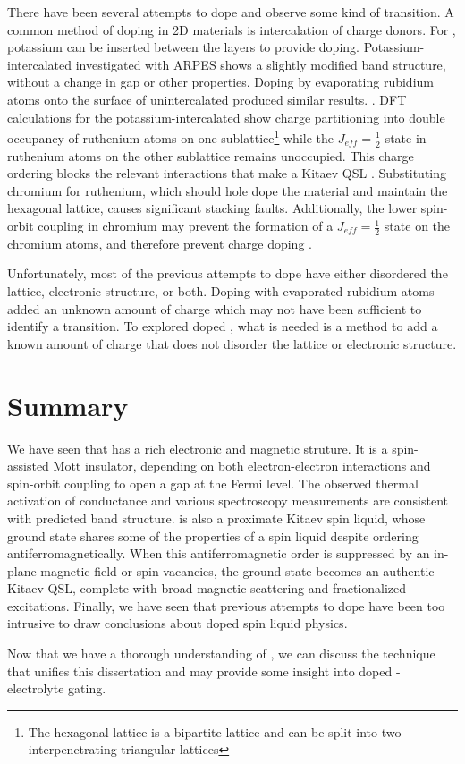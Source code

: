 There have been several attempts to dope \rucl and observe some kind of transition. A common method of doping in 2D materials is intercalation of charge donors. For \ruclnospace , potassium can be inserted between the layers to provide doping. Potassium-intercalated \rucl investigated with ARPES shows a slightly modified band structure, without a change in gap or other properties. Doping by evaporating rubidium atoms onto the surface of unintercalated \rucl produced similar results. \cite{Zhou2016}. DFT calculations for the potassium-intercalated \rucl show charge partitioning into double occupancy of ruthenium atoms on one sublattice\footnote{The hexagonal lattice is a bipartite lattice and can be split into two interpenetrating triangular lattices} while the $J_{eff} = \frac{1}{2}$ state in ruthenium atoms on the other sublattice remains unoccupied. This charge ordering blocks the relevant interactions that make \rucl a Kitaev QSL \cite{Koitzsch2017}. Substituting chromium for ruthenium, which should hole dope the material and maintain the hexagonal lattice, causes significant stacking faults. Additionally, the lower spin-orbit coupling in chromium \cite{Fisk1968} may prevent the formation of a $J_{eff} = \frac{1}{2}$ state on the chromium atoms, and therefore prevent charge doping \cite{Roslova2019}.

Unfortunately, most of the previous attempts to dope \rucl have either disordered the lattice, electronic structure, or both. Doping with evaporated rubidium atoms added an unknown amount of charge which may not have been sufficient to identify a transition. To explored doped \ruclnospace, what is needed is a method to add a known amount of charge that does not disorder the lattice or electronic structure.

\section{Summary}

We have seen that \ruclnospace has a rich electronic and magnetic struture. It is a spin-assisted Mott insulator, depending on both electron-electron interactions and spin-orbit coupling to open a gap at the Fermi level. The observed thermal activation of conductance and various spectroscopy measurements are consistent with predicted band structure. \rucl is also a proximate Kitaev spin liquid, whose ground state shares some of the properties of a spin liquid despite ordering antiferromagnetically. When this antiferromagnetic order is suppressed by an in-plane magnetic field or spin vacancies, the ground state becomes an authentic Kitaev QSL, complete with broad magnetic scattering and fractionalized excitations. Finally, we have seen that previous attempts to dope \rucl have been too intrusive to draw conclusions about doped spin liquid physics.

Now that we have a thorough understanding of \ruclnospace , we can discuss the technique that unifies this dissertation and may provide some insight into doped \rucl - electrolyte gating.